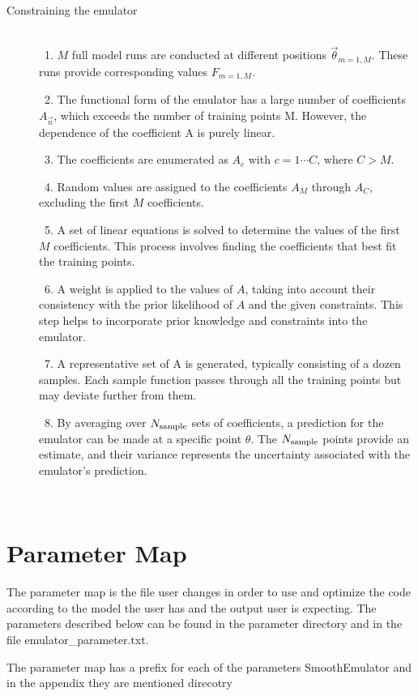 \documentclass[12pt]{article}
\numberwithin{equation}{section}
\numberwithin{figure}{section}
\begin{document}
\begin{description}
\item[Constraining the emulator] \
\\
\ 1. $M$ full model runs are conducted at different positions $\vec{\theta}_{m=1,M}$. These runs provide corresponding values $F_{m=1,M}$. 

\ 2. The functional form of the emulator has a large number of coefficients $A_{\vec{n}}$, which exceeds the number of training points M. However, the dependence of the coefficient A is purely linear. 

\ 3. The coefficients are enumerated as $A_c$ with $c=1\cdots C$, where $C>M$.

\ 4. Random values are assigned to the coefficients $A_M$ through $A_C$, excluding the first $M$ coefficients. 

\ 5. A set of linear equations is solved to determine the values of the first $M$ coefficients. This process involves finding the coefficients that best fit the training points. 

\ 6. A weight is applied to the values of $A$, taking into account their consistency with the prior likelihood of $A$ and the given constraints. This step helps to incorporate prior knowledge and constraints into the emulator. 

\ 7. A representative set of A is generated, typically consisting of a dozen samples. Each sample function passes through all the training points but may deviate further from them. 

\ 8. By averaging over $N_{\rm sample}$ sets of coefficients, a prediction for the emulator can be made at a specific point $\theta$. The $N_{\rm sample}$ points provide an estimate, and their variance represents the uncertainty associated with the emulator's prediction. 

\end{description}\




\appendix


\section{Parameter Map}
The parameter map is the file user changes in order to use and optimize the code according to the model the user has and the output user is expecting. The parameters described below can be found in the parameter directory and in the file emulator\_parameter.txt.

The parameter map has a prefix for each of the parameters SmoothEmulator and in the appendix they are mentioned direcotry 
\end{document}
